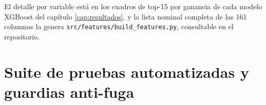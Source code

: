 \begin{sloppypar}
\begin{table}[htbp]
  \centering
  
  \caption{}
  \label{tab:anexo1_grupos_features}
\end{table}

El detalle por variable está en los cuadros de top-15 por ganancia de cada modelo XGBoost
del capítulo \ref{cap:resultados}, y la lista nominal completa de las 161 columnas la
genera \texttt{src/features/build\_features.py}, consultable en el repositorio.
\end{sloppypar}

\chapter{Suite de pruebas automatizadas y guardias anti-fuga}\label{cap:anexo2}


